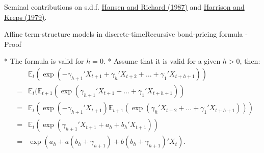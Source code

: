 \begin{exampleblock}{Seminal contributions on s.d.f.}
\href{http://faculty.chicagobooth.edu/john.cochrane/teaching/35904_asset_pricing/hansen\%20richard\%20econometrica.pdf}{Hansen and Richard (1987)} and \href{http://www.sciencedirect.com/science/article/pii/0022053179900437}{Harrison and Kreps (1979)}.
\end{exampleblock}





{Affine term-structure models in discrete-time}{Recursive bond-pricing formula - Proof}\label{slide:proofrecursive}
\hyperlink{slide:ATSM}{}
\begin{small}

	* The formula is valid for $h=0$.
	* Assume that it is valid for a given $h>0$, then:
	\begin{eqnarray*}
	&& \mathbb{E}_t(\exp(-\gamma_{h+1}'X_{t+1}+\gamma_h'X_{t+2} + \dots + \gamma_1'X_{t+h+1}))\\
	&=& \mathbb{E}_t(\mathbb{E}_{t+1}(\exp(\gamma_{h+1}'X_{t+1} + \dots + \gamma_{1}'X_{t+h+1})) \\
	&=& \mathbb{E}_t(\exp(-\gamma_{h+1}'X_{t+1})\mathbb{E}_{t+1}(\exp(\gamma_{h}'X_{t+2} + \dots + \gamma_{1}'X_{t+h+1}))) \\
	&=& \mathbb{E}_t(\exp(\gamma_{h+1}'X_{t+1} + a_h + b_h'X_{t+1})) \\
	&=& \exp(a_h + a(b_h+\gamma_{h+1}) +  b(b_h+\gamma_{h+1})'X_{t}).
	\end{eqnarray*}

\end{small}




\label{slide:proofaffineBY}


